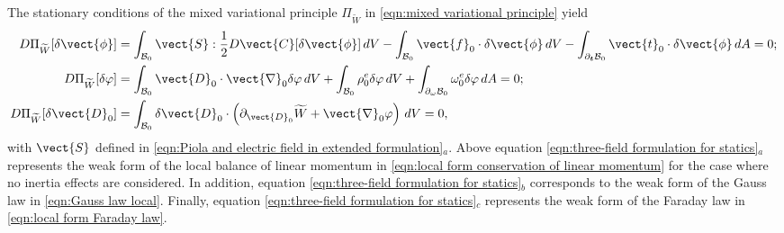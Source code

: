The stationary conditions of the mixed variational principle $\Pi_{\widetilde{W}}$ in \eqref{eqn:mixed variational principle} yield
%
\begin{equation}\label{eqn:three-field formulation for statics}
\begin{aligned}
D\Pi_{\widetilde{W}}[\delta\vect{\phi}]& =  \int_{\mathcal{B}_0}\vect{S}:\frac{1}{2}D\vect{C}[\delta\vect{\phi}]\,dV  - \int_{\mathcal{B}_0}\vect{f}_0\cdot\delta\vect{\phi}\,dV-
\int_{\partial_{\boldsymbol{t}}\mathcal{B}_0}\vect{t}_0\cdot\delta\vect{\phi}\,dA=0;\\
%
D\Pi_{\widetilde{W}}[\delta\varphi]& =  \int_{\mathcal{B}_0}\vect{D}_0\cdot\vect{\nabla}_0\delta\varphi\,dV + \int_{\mathcal{B}_0}\rho_0^e\delta\varphi\,dV+
\int_{\partial_\omega\mathcal{B}_0}\omega^e_0\delta\varphi\,dA=0;\\
%
D\Pi_{\widetilde{W}}[\delta\vect{D}_0]& =  \int_{\mathcal{B}_0}\delta\vect{D}_0\cdot\left(\partial_{\vect{D}_0}\widetilde{W} + \vect{\nabla}_0\varphi\right)\,dV=0,
%
\end{aligned}
\end{equation}
%
with $\vect{S}$ defined in \eqref{eqn:Piola and electric field in extended formulation}$_a$.
%
%
%
Above equation \eqref{eqn:three-field formulation for statics}$_a$ represents the weak form of the local balance of linear momentum  in \eqref{eqn:local form conservation of linear momentum} for the case where no inertia effects are considered. 
In addition, equation \eqref{eqn:three-field formulation for statics}$_b$ corresponds to the weak form of the Gauss law in \eqref{eqn:Gauss law local}. 
Finally, equation \eqref{eqn:three-field formulation for statics}$_c$ represents the weak form of the Faraday law in  \eqref{eqn:local form Faraday law}.


\noindent\makebox[\linewidth]{\rule{\textwidth}{0.4pt}}

